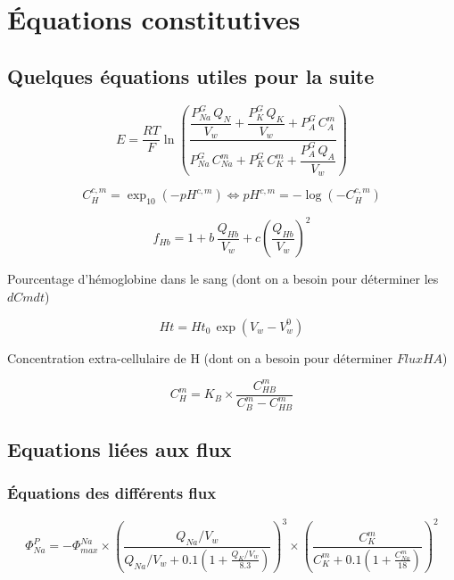 \documentclass[a4paper,fleqn]{article}
\begin{document}
\section{Équations constitutives}

\subsection{Quelques équations utiles pour la suite}

\begin{equation}
E =  \frac{RT}{F}\ln{\left(\frac{\dfrac{P_{Na}^G\,Q_N}{V_w} + \dfrac{P_K^G\,Q_K}{V_w} + P_A^G\,C_A^m}{P_{Na}^G\,C_{Na}^m + P_K^G\,C_K^m + \dfrac{P_A^G\,Q_A}{V_w}}\right)}
\end{equation}

\begin{equation}
{C_{H}^{c,m}=\exp_{10}{\left(-pH^{c,m}\right)}}\Longleftrightarrow{pH^{c,m}=-\log{\left(-C_{H}^{c,m}\right)}}
\end{equation}

\begin{equation}
f_{Hb}=1+b\,\frac{Q_{Hb}}{V_w }+{c}\left(\frac{Q_{Hb}}{V_w }\right)^2
\end{equation}

Pourcentage d'hémoglobine dans le sang (dont on a besoin pour déterminer les $dCmdt$)

\begin{equation}
Ht = Ht_0\,\exp{(V_w-V_w^0)}
\end{equation}

Concentration extra-cellulaire de H (dont on a besoin pour déterminer $FluxHA$)

\begin{equation}
C_{H}^{m}={K_B}\times{\frac{C_{HB}^{m}}{C_{B}^{m}-C_{HB}^{m}}}
\end{equation}

\subsection{Equations liées aux flux}
\subsubsection*{Équations des différents flux}

\begin{equation}
\Phi_{Na}^{P}={-\Phi_{max}^{Na}}\times{\left(\frac{Q_{Na}/V_w}{Q_{Na}/V_w+0.1\left(1+\frac{Q_{K}/V_w}{8.3}\right)}\right)^3}\times{\left(\frac{C_{K}^{m}}{C_{K}^{m}+0.1\left(1+\frac{C_{Na}^{m}}{18}\right)}\right)^2}
\end{equation}
\end{document}
